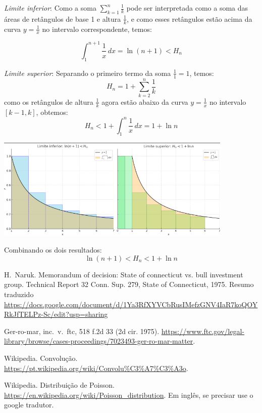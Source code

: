 \documentclass[a4paper,12pt]{article}
\begin{document}
\medskip

\emph{Limite inferior}: Como a soma \( \sum_{k=1}^n \frac{1}{k} \) pode
ser interpretada como a soma das áreas de retângulos de base 1 e altura
\( \frac{1}{k} \), e como esses retângulos estão acima da curva
\( y = \frac{1}{x} \) no intervalo correspondente, temos:

\[
\int_1^{n+1} \frac{1}{x} \, dx = \ln(n+1) < H_n
\]

\medskip

\emph{Limite superior}: 
Separando o primeiro termo da soma \( \frac{1}{1} = 1 \), temos:
\[
H_n = 1 + \sum_{k=2}^n \frac{1}{k}
\]
como os retângulos de altura \( \frac{1}{k} \) agora estão abaixo
da curva \( y = \frac{1}{x} \) no intervalo \( [k-1, k] \), obtemos:
\[
H_n < 1 + \int_1^n \frac{1}{x} \, dx = 1 + \ln n
\]

    {\centering
    \includegraphics[width=0.85\textwidth]{harmonico.png}}

Combinando os dois resultados:
\[
\boxed{
\ln(n+1) < H_n < 1 + \ln n
}
\]






% 

\begin{thebibliography}{1}

 H.~Naruk.  \newblock Memorandum of decision: State of
  connecticut vs. bull investment group.  \newblock Technical Report 32
  Conn. Sup. 279, State of Connecticut, 1975. \newblock Resumo
  traduzido \url{https://docs.google.com/document/d/1Ya3RfXYVCbRusIMefzGNV4IaR7koQOYRkJfTELPz-Sc/edit?usp=sharing}

 Ger-ro-mar, inc.~v.~ftc, 518 f.2d 33 (2d
  cir. 1975).  \newblock
  \url{https://www.ftc.gov/legal-library/browse/cases-proceedings/7023493-ger-ro-mar-matter}.

 Wikipedia.  \newblock Convolução.
  \newblock \url{https://pt.wikipedia.org/wiki/Convolu%C3%A7%C3%A3o}.

 Wikipedia.  \newblock Distribuição de Poisson.
  \newblock \url{https://en.wikipedia.org/wiki/Poisson_distribution}.
  \newblock Em inglês, se precisar use o google tradutor.

    
\end{thebibliography}
\end{document}
